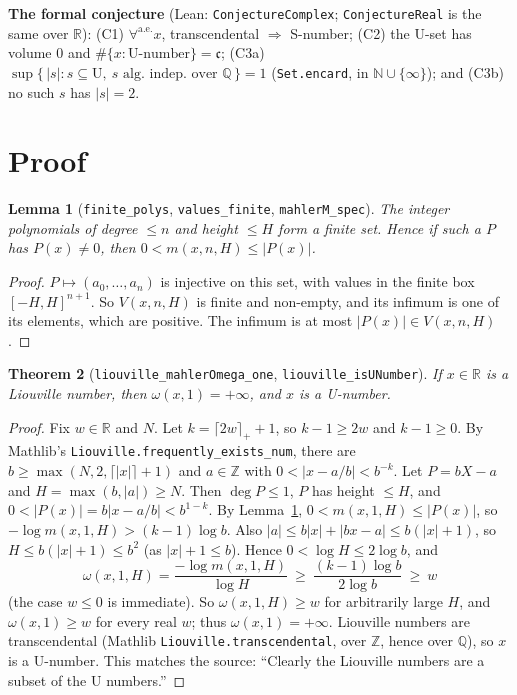 \documentclass[11pt]{article}
\newtheorem{theorem}{Theorem}
\newtheorem{lemma}[theorem]{Lemma}
\theoremstyle{definition}
\begin{document}
\textbf{The formal conjecture} (Lean: \texttt{ConjectureComplex}; \texttt{ConjectureReal} is the
same over $\mathbb R$):
(C1) $\forall^{\text{a.e.}}x$, transcendental $\Rightarrow$ S-number;
(C2) the U-set has volume $0$ and $\#\{x : \text{U-number}\}=\mathfrak c$;
(C3a) $\sup\{\,|s| : s\subseteq\mathrm U,\ s \text{ alg.\ indep.\ over }\mathbb Q\,\}=1$
(\texttt{Set.encard}, in $\mathbb N\cup\{\infty\}$); and
(C3b) no such $s$ has $|s|=2$.

\section{Proof}

\begin{lemma}[\texttt{finite\_polys}, \texttt{values\_finite}, \texttt{mahlerM\_spec}]
\label{lem:fin}
The integer polynomials of degree $\le n$ and height $\le H$ form a finite set. Hence if such a
$P$ has $P(x)\ne0$, then $0<m(x,n,H)\le|P(x)|$.
\end{lemma}
\begin{proof}
$P\mapsto(a_0,\dots,a_n)$ is injective on this set, with values in the finite box
$[-H,H]^{n+1}$. So $V(x,n,H)$ is finite and non-empty, and its infimum is one of its elements,
which are positive. The infimum is at most $|P(x)|\in V(x,n,H)$.
\end{proof}

\begin{theorem}[\texttt{liouville\_mahlerOmega\_one}, \texttt{liouville\_isUNumber}]
If $x\in\mathbb R$ is a Liouville number, then $\omega(x,1)=+\infty$, and $x$ is a U-number.
\end{theorem}
\begin{proof}
Fix $w\in\mathbb R$ and $N$. Let $k=\lceil 2w\rceil_+ +1$, so $k-1\ge 2w$ and $k-1\ge0$.
By Mathlib's \texttt{Liouville.frequently\_exists\_num}, there are $b\ge\max(N,2,\lceil|x|\rceil+1)$
and $a\in\mathbb Z$ with $0<|x-a/b|<b^{-k}$. Let $P=bX-a$ and $H=\max(b,|a|)\ge N$. Then
$\deg P\le1$, $P$ has height $\le H$, and $0<|P(x)|=b|x-a/b|<b^{1-k}$. By
Lemma~\ref{lem:fin}, $0<m(x,1,H)\le|P(x)|$, so $-\log m(x,1,H)>(k-1)\log b$. Also
$|a|\le b|x|+|bx-a|\le b(|x|+1)$, so $H\le b(|x|+1)\le b^2$ (as $|x|+1\le b$). Hence
$0<\log H\le2\log b$, and
\[
\omega(x,1,H)=\frac{-\log m(x,1,H)}{\log H}\ \ge\ \frac{(k-1)\log b}{2\log b}\ \ge\ w
\]
(the case $w\le0$ is immediate). So $\omega(x,1,H)\ge w$ for arbitrarily large $H$, and
$\omega(x,1)\ge w$ for every real $w$; thus $\omega(x,1)=+\infty$. Liouville numbers are
transcendental (Mathlib \texttt{Liouville.transcendental}, over $\mathbb Z$, hence over
$\mathbb Q$), so $x$ is a U-number. This matches the source: ``Clearly the Liouville numbers are
a subset of the U numbers.''
\end{proof}
\end{document}
